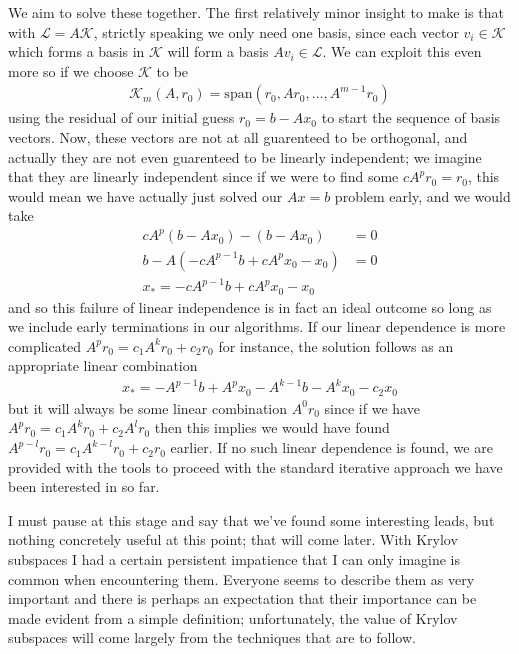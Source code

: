 \documentclass[11pt]{article}
\begin{document}
We aim to solve these together. The first relatively minor insight to make is that with $\mathcal L = A \mathcal K$, strictly speaking we only need one basis, since each vector $v_i \in \mathcal K$ which forms a basis in $\mathcal K$ will form a basis $A v_i \in \mathcal L$. We can exploit this even more so if we choose $\mathcal K$ to be \begin{gather*}
\mathcal{K}_m (A,r_0) = \mathrm{span}(r_0, Ar_0, \dots, A^{m-1} r_0)
\end{gather*}
using the residual of our initial guess $r_0 = b - Ax_0$ to start the sequence of basis vectors. Now, these vectors are not at all guarenteed to be orthogonal, and actually they are not even guarenteed to be linearly independent; we imagine that they are linearly independent since if we were to find some $c A^p r_0 = r_0$, this would mean we have actually just solved our $Ax = b$ problem early, and we would take \begin{align*}
c A^p (b - Ax_0) - (b - A x_0) &= 0 \\
b - A (- c A^{p-1}b + cA^p x_0 - x_0) &= 0 \\
x_* = - c A^{p-1}b + cA^p x_0 - x_0
\end{align*}
and so this failure of linear independence is in fact an ideal outcome so long as we include early terminations in our algorithms. If our linear dependence is more complicated $A^p r_0 = c_1 A^k r_0 + c_2 r_0$ for instance, the solution follows as an appropriate linear combination \begin{gather*}
x_* = -A^{p-1}b + A^p x_0 - A^{k-1}b - A^{k}x_0 - c_2 x_0
\end{gather*}
but it will always be some linear combination $A^0 r_0$ since if we have $A^p r_0 = c_1 A^k r_0 + c_2 A^{l}r_0$ then this implies we would have found $A^{p-l} r_0 = c_1 A^{k-l} r_0 + c_2 r_0$ earlier. If no such linear dependence is found, we are provided with the tools to proceed with the standard iterative approach we have been interested in so far.

I must pause at this stage and say that we've found some interesting leads, but nothing concretely useful at this point; that will come later. With Krylov subspaces I had a certain persistent impatience that I can only imagine is common when encountering them. Everyone seems to describe them as very important and there is perhaps an expectation that their importance can be made evident from a simple definition; unfortunately, the value of Krylov subspaces will come largely from the techniques that are to follow.
\end{document}

